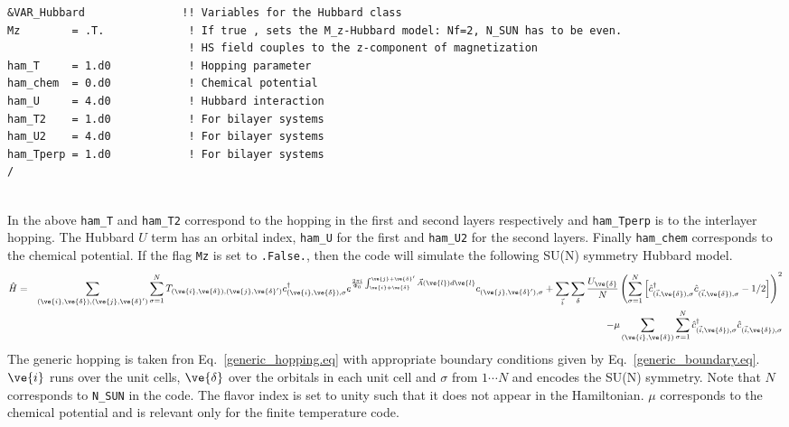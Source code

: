 \begin{lstlisting}[style=fortran,escapechar=\#,breaklines=true]
&VAR_Hubbard               !! Variables for the Hubbard class
Mz        = .T.             ! If true , sets the M_z-Hubbard model: Nf=2, N_SUN has to be even.  
                            ! HS field couples to the z-component of magnetization
ham_T     = 1.d0            ! Hopping parameter
ham_chem  = 0.d0            ! Chemical potential
ham_U     = 4.d0            ! Hubbard interaction
ham_T2    = 1.d0            ! For bilayer systems
ham_U2    = 4.d0            ! For bilayer systems
ham_Tperp = 1.d0            ! For bilayer systems
/
               
\end{lstlisting}
In the above   \texttt{ham\_T} and \texttt{ham\_T2}   correspond to the hopping in the first and second layers respectively and  \texttt{ham\_Tperp}   is to the interlayer hopping.   The Hubbard $U$ term has an orbital index, 
 \texttt{ham\_U}  for the first and  \texttt{ham\_U2}   for the second layers.  Finally   \texttt{ham\_chem}  corresponds to the chemical potential.     If  the flag \texttt{Mz} is set to \texttt{.False.},   then the code will simulate the  following 
SU(N)   symmetry Hubbard model. 
\begin{eqnarray}
\hat{H}= & & \sum_{(\ve{i},\ve{\delta}), (\ve{j},\ve{\delta}')}  \sum_{\sigma =1}^{N}  T_{(\ve{i},\ve{\delta}), (\ve{j},\ve{\delta}')}    c^{\dagger}_{(\ve{i},\ve{\delta}), \sigma }   e^{\frac{2 \pi i}{\Phi_0} \int_{\ve{i} + \ve{\delta}}^{\ve{j} + \ve{\delta}'}  
     \vec{A}(\ve{l})  d \ve{l}} c^{}_{(\ve{j},\ve{\delta}'),\sigma} 
+ \sum_{\vec{i}} \sum_{\delta}   \frac{U_{\ve{\delta}} }{N} \left(\sum_{\sigma=1}^{N}  \left[   \hat{c}^{\dagger}_{(\vec{i},\ve{\delta}),\sigma } 
    \hat{c}^{\phantom\dagger}_{(\vec{i}, \ve{\delta}),\sigma }  - 1/2  \right] \right)^2  \nonumber \\
    & & - \mu \sum_{(\ve{i},\ve{\delta})}  \sum_{\sigma =1}^{N} \hat{c}^{\dagger}_{(\vec{i},\ve{\delta}),\sigma } \hat{c}^{\phantom\dagger}_{(\vec{i},\ve{\delta}),\sigma } 
\end{eqnarray}
The  generic hopping is taken fron Eq.~\ref{generic_hopping.eq}   with appropriate boundary conditions given by Eq.~\ref{generic_boundary.eq}.    $\ve{i}$ runs over the unit cells, $\ve{\delta}$ over the orbitals in each unit cell and $\sigma$  from $1 \cdots N$  and encodes  the SU(N) symmetry.    Note that  $N$ corresponds to \texttt{N\_SUN}  in the code.  The flavor index is set to  unity such that it does not appear in the  Hamiltonian.  $\mu$ corresponds to the chemical potential  and is relevant only for the finite temperature code. 

